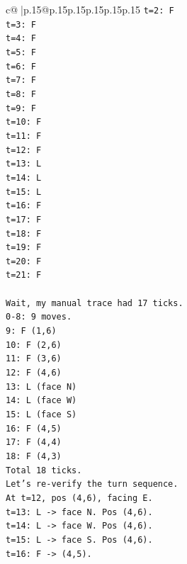 \documentclass{article}
\begin{document}
{\begin{supertabular}{c@{$\;$}|p{.15\linewidth}@{}p{.15\linewidth}p{.15\linewidth}p{.15\linewidth}p{.15\linewidth}p{.15\linewidth}}
{{{\texttt{t=2: F} \\
\texttt{t=3: F} \\
\texttt{t=4: F} \\
\texttt{t=5: F} \\
\texttt{t=6: F} \\
\texttt{t=7: F} \\
\texttt{t=8: F} \\
\texttt{t=9: F} \\
\texttt{t=10: F} \\
\texttt{t=11: F} \\
\texttt{t=12: F} \\
\texttt{t=13: L} \\
\texttt{t=14: L} \\
\texttt{t=15: L} \\
\texttt{t=16: F} \\
\texttt{t=17: F} \\
\texttt{t=18: F} \\
\texttt{t=19: F} \\
\texttt{t=20: F} \\
\texttt{t=21: F} \\
\\ 
\texttt{Wait, my manual trace had 17 ticks.} \\
\texttt{0{-}8: 9 moves.} \\
\texttt{9: F (1,6)} \\
\texttt{10: F (2,6)} \\
\texttt{11: F (3,6)} \\
\texttt{12: F (4,6)} \\
\texttt{13: L (face N)} \\
\texttt{14: L (face W)} \\
\texttt{15: L (face S)} \\
\texttt{16: F (4,5)} \\
\texttt{17: F (4,4)} \\
\texttt{18: F (4,3)} \\
\texttt{Total 18 ticks.} \\
\texttt{Let's re{-}verify the turn sequence.} \\
\texttt{At t=12, pos (4,6), facing E.} \\
\texttt{t=13: L {-}> face N. Pos (4,6).} \\
\texttt{t=14: L {-}> face W. Pos (4,6).} \\
\texttt{t=15: L {-}> face S. Pos (4,6).} \\
\texttt{t=16: F {-}> (4,5).} \\
}}}
\end{supertabular}}
\end{document}
